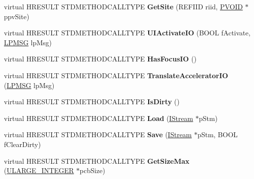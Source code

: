 \begin{DoxyCompactItemize}
\item 
\mbox{\label{class_c_menu_band_a27f153f56ddf2136ca819780c1adad92}} 
virtual H\+R\+E\+S\+U\+LT S\+T\+D\+M\+E\+T\+H\+O\+D\+C\+A\+L\+L\+T\+Y\+PE {\bfseries Get\+Site} (R\+E\+F\+I\+ID riid, \hyperlink{interfacevoid}{P\+V\+O\+ID} $\ast$ppv\+Site)
\item 
\mbox{\label{class_c_menu_band_a45ee1328b1c8caf6b91b9aafd438561a}} 
virtual H\+R\+E\+S\+U\+LT S\+T\+D\+M\+E\+T\+H\+O\+D\+C\+A\+L\+L\+T\+Y\+PE {\bfseries U\+I\+Activate\+IO} (B\+O\+OL f\+Activate, \hyperlink{structtag_m_s_g}{L\+P\+M\+SG} lp\+Msg)
\item 
\mbox{\label{class_c_menu_band_a09071438c7533fc0c128d0af3faacf6c}} 
virtual H\+R\+E\+S\+U\+LT S\+T\+D\+M\+E\+T\+H\+O\+D\+C\+A\+L\+L\+T\+Y\+PE {\bfseries Has\+Focus\+IO} ()
\item 
\mbox{\label{class_c_menu_band_a853968979d17776c46f55383adaca956}} 
virtual H\+R\+E\+S\+U\+LT S\+T\+D\+M\+E\+T\+H\+O\+D\+C\+A\+L\+L\+T\+Y\+PE {\bfseries Translate\+Accelerator\+IO} (\hyperlink{structtag_m_s_g}{L\+P\+M\+SG} lp\+Msg)
\item 
\mbox{\label{class_c_menu_band_a9b562d672fa4d6518382037152b965c2}} 
virtual H\+R\+E\+S\+U\+LT S\+T\+D\+M\+E\+T\+H\+O\+D\+C\+A\+L\+L\+T\+Y\+PE {\bfseries Is\+Dirty} ()
\item 
\mbox{\label{class_c_menu_band_a05667e814e8ceb3f4618f358f7a95f64}} 
virtual H\+R\+E\+S\+U\+LT S\+T\+D\+M\+E\+T\+H\+O\+D\+C\+A\+L\+L\+T\+Y\+PE {\bfseries Load} (\hyperlink{interface_i_stream}{I\+Stream} $\ast$p\+Stm)
\item 
\mbox{\label{class_c_menu_band_acf8c3f08349993158f19948b51c9988b}} 
virtual H\+R\+E\+S\+U\+LT S\+T\+D\+M\+E\+T\+H\+O\+D\+C\+A\+L\+L\+T\+Y\+PE {\bfseries Save} (\hyperlink{interface_i_stream}{I\+Stream} $\ast$p\+Stm, B\+O\+OL f\+Clear\+Dirty)
\item 
\mbox{\label{class_c_menu_band_ab194888ce12bf8c7e6c26e3aaa582ea9}} 
virtual H\+R\+E\+S\+U\+LT S\+T\+D\+M\+E\+T\+H\+O\+D\+C\+A\+L\+L\+T\+Y\+PE {\bfseries Get\+Size\+Max} (\hyperlink{struct___u_l_a_r_g_e___i_n_t_e_g_e_r}{U\+L\+A\+R\+G\+E\+\_\+\+I\+N\+T\+E\+G\+ER} $\ast$pcb\+Size)

\end{DoxyCompactItemize}
